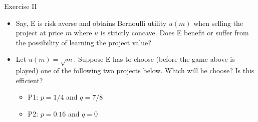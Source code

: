 \documentclass[bigger]{beamer}
\begin{document}
\begin{frame}[label={sec:orgheadline23}]{Exercise II}
\begin{itemize}
\item Say, E is risk averse and obtains Bernoulli utility \(u(m)\) when selling the project at price \(m\) where \(u\) is strictly concave. Does E benefit or suffer from the possibility of learning the project value?

\item Let \(u(m)=\sqrt{m}\). Suppose E has to choose (before the game above is played) one of the following two projects below. Which will he choose? Is this efficient?
\begin{itemize}
\item P1: \(p=1/4\) and \(q=7/8\)
\item P2: \(p=0.16\) and \(q=0\)
\end{itemize}
\end{itemize}
\end{frame}
\end{document}
